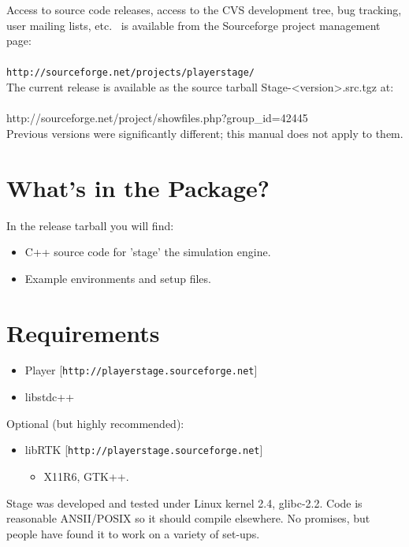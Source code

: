 \documentclass[11pt,twoside]{report}
\def\HOMEPAGE {{\tt http://playerstage.sourceforge.net}}
\def\SFPAGE {{\tt http://sourceforge.net/projects/playerstage/}}
\begin{document}
   \noindent Access to source code releases, access to the CVS
   development tree, bug tracking, user mailing lists, etc.~ is
   available from the Sourceforge project management page:\\\\\indent
   \SFPAGE\\

   \noindent The current release is available as the source tarball
 Stage-<version>.src.tgz at:\\\\ \indent
 http://sourceforge.net/project/showfiles.php?group\_id=42445\\

	Previous versions were significantly different; this manual
   does not apply to them.

  \section{What's in the Package?}

    In the release tarball you will find:
      \begin{itemize}    
      \item C++ source code for 'stage' the simulation engine.
      \item Example environments and setup files.
      \end{itemize}



  \section{Requirements}

    \begin{itemize}
    \item Player [\HOMEPAGE]
    \item libstdc++
    \end{itemize}
    
    Optional (but highly recommended): 
    \begin{itemize}
      \item libRTK [\HOMEPAGE]
	\begin{itemize}
	  \item X11R6, GTK++.
\end{itemize}
	\end{itemize}

    Stage was developed and tested under Linux kernel 2.4,
    glibc-2.2.  Code is reasonable ANSII/POSIX so it should compile
    elsewhere. No promises, but people have found it to work on a
    variety of set-ups.
  
\end{document}
